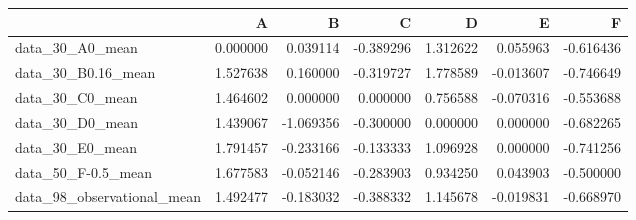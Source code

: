 \begin{tabular}{lrrrrrr}
\toprule
{} &         A &         B &         C &         D &         E &         F \\
\midrule
data\_30\_A0\_mean            &  0.000000 &  0.039114 & -0.389296 &  1.312622 &  0.055963 & -0.616436 \\
data\_30\_B0.16\_mean         &  1.527638 &  0.160000 & -0.319727 &  1.778589 & -0.013607 & -0.746649 \\
data\_30\_C0\_mean            &  1.464602 &  0.000000 &  0.000000 &  0.756588 & -0.070316 & -0.553688 \\
data\_30\_D0\_mean            &  1.439067 & -1.069356 & -0.300000 &  0.000000 &  0.000000 & -0.682265 \\
data\_30\_E0\_mean            &  1.791457 & -0.233166 & -0.133333 &  1.096928 &  0.000000 & -0.741256 \\
data\_50\_F-0.5\_mean         &  1.677583 & -0.052146 & -0.283903 &  0.934250 &  0.043903 & -0.500000 \\
data\_98\_observational\_mean &  1.492477 & -0.183032 & -0.388332 &  1.145678 & -0.019831 & -0.668970 \\
\bottomrule
\end{tabular}
